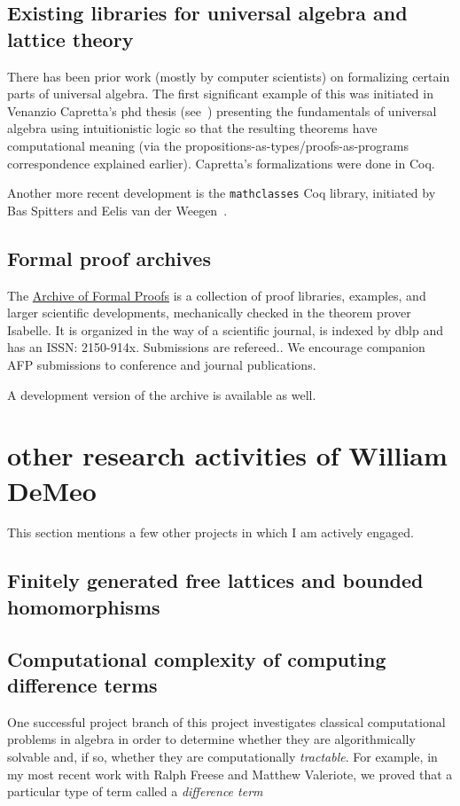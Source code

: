 \documentclass[12pt]{amsart}  %
\begin{document}
\subsection{Existing libraries for universal algebra and lattice theory}
There has been prior work (mostly by computer scientists) on formalizing certain
parts of universal algebra. The first significant example of this was initiated in 
Venanzio Capretta's phd thesis (see~\cite{capretta:1999})
presenting the fundamentals of universal algebra using intuitionistic logic
so that the resulting theorems have computational meaning (via the propositions-as-types/proofs-as-programs
correspondence explained earlier).  Capretta's formalizations were done in Coq.

Another more recent development is 
the {\tt mathclasses} Coq library, initiated by Bas Spitters and 
Eelis van der Weegen~\cite{MR2678760}. 




\subsection{Formal proof archives}
The \href{https://www.isa-afp.org/}{Archive of Formal Proofs} is a collection of proof libraries,
examples, and larger scientific developments, mechanically checked in the theorem prover Isabelle.
It is organized in the way of a scientific journal, is indexed by dblp and has an ISSN: 2150-914x.
Submissions are refereed.. We encourage companion AFP submissions to conference and journal publications. 

A development version of the archive is available as well.



\section{other research activities of William DeMeo}
\label{sec:other}

This section mentions a few other projects in which I am actively engaged.

\subsection{Finitely generated free lattices and bounded homomorphisms}
\label{sec:fg-free-lat}





\subsection{Computational complexity of computing difference terms}
\label{sec:software-development}
One successful project branch of this project investigates classical computational problems
in algebra in order to determine whether they are algorithmically solvable
and, if so, whether they are computationally \emph{tractable}.
For example, in my most recent work with Ralph Freese and Matthew Valeriote,
we proved that a particular type of term called a \emph{difference term}
\end{document}
